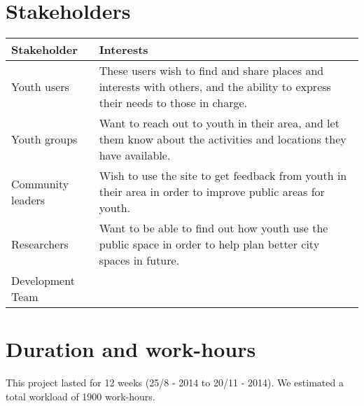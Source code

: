 \section{Stakeholders}
\begin{tabular}{|l|p{8cm}|}
\hline
\textbf{Stakeholder} & \textbf{Interests} \\
\hline
Youth users          & These users wish to find and share places and interests with others, and the ability to express their needs to those in charge. \\
\hline
Youth groups         & Want to reach out to youth in their area, and let them know about the activities and locations they have available. \\
\hline
Community leaders    & Wish to use the site to get feedback from youth in their area in order to improve public areas for youth. \\
\hline
Researchers          & Want to be able to find out how youth use the public space in order to help plan better city spaces in future. \\
\hline
Development Team     & \\
\hline
\end{tabular}

\section{Duration and work-hours} This project lasted for 12 weeks (25/8 - 2014 to 20/11 - 2014). We estimated a total workload of 1900 work-hours.